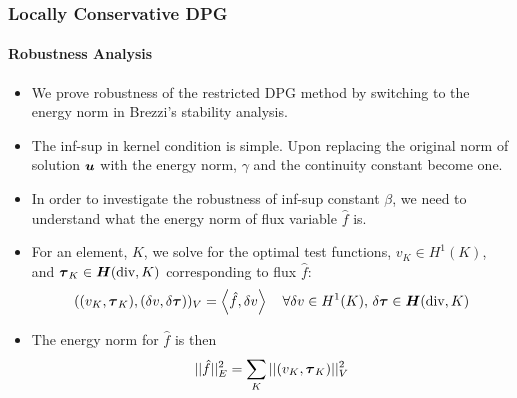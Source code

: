 \documentclass[18pt,xcolor=table]{beamer}
\begin{document}
%                                                                                                      
%                                                                                                      
%  
\begin{frame}
\frametitle{Locally Conservative DPG}
\framesubtitle{Robustness Analysis}
\begin{itemize}
  \item We prove robustness of the restricted DPG method by switching to the
    energy norm in Brezzi's stability analysis.
  \item The inf-sup in kernel condition is simple. Upon replacing the original
    norm of solution $\boldsymbol u$ with the energy norm, $\gamma$ and the continuity
    constant become one.
  \item In order to investigate the robustness of inf-sup constant $\beta$, we
    need to understand what the energy norm of flux variable $\hat f$ is.
  \item For an element, $K$, we solve for the optimal test functions,
    $v_K\in H^1(K)$, and $\boldsymbol\tau_K\in\mbox{\boldmath $H$}(\text{div},K)$
    corresponding to flux $\hat f$:
    \[
    ( (v_K,\boldsymbol\tau_K),(\delta v,\delta\boldsymbol\tau) )_V=\left\langle \hat f,\delta v \right\rangle
    \quad\forall\delta v\in H^1(K),\,\delta\boldsymbol\tau\in\mbox{\boldmath $H$}(\text{div},K)
    \]
  \item The energy norm for $\hat f$ is then
    \[
    ||\hat f||_E^2=\sum_K||(v_K,\boldsymbol\tau_K)||_V^2
    \]
\end{itemize}
\end{frame}

\end{document}
